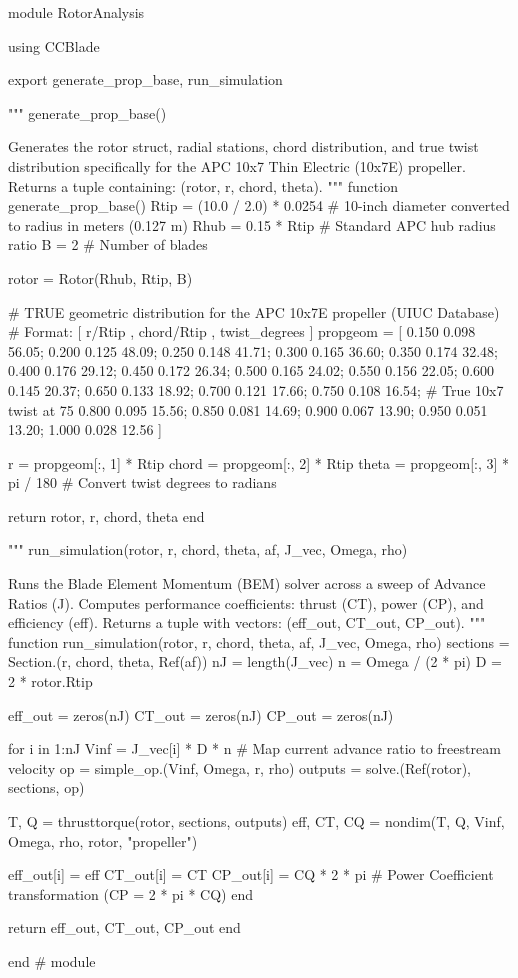 module RotorAnalysis

using CCBlade

export generate_prop_base, run_simulation

"""
    generate_prop_base()

Generates the rotor struct, radial stations, chord distribution, and true twist distribution 
specifically for the APC 10x7 Thin Electric (10x7E) propeller.
Returns a tuple containing: (rotor, r, chord, theta).
"""
function generate_prop_base()
    Rtip = (10.0 / 2.0) * 0.0254 # 10-inch diameter converted to radius in meters (0.127 m)
    Rhub = 0.15 * Rtip            # Standard APC hub radius ratio
    B = 2                         # Number of blades
    
    rotor = Rotor(Rhub, Rtip, B)
    
    # TRUE geometric distribution for the APC 10x7E propeller (UIUC Database)
    # Format: [ r/Rtip , chord/Rtip , twist_degrees ]
    propgeom = [
        0.150   0.098   56.05;
        0.200   0.125   48.09;
        0.250   0.148   41.71;
        0.300   0.165   36.60;
        0.350   0.174   32.48;
        0.400   0.176   29.12;
        0.450   0.172   26.34;
        0.500   0.165   24.02;
        0.550   0.156   22.05;
        0.600   0.145   20.37;
        0.650   0.133   18.92;
        0.700   0.121   17.66;
        0.750   0.108   16.54;  # True 10x7 twist at 75%
        0.800   0.095   15.56;
        0.850   0.081   14.69;
        0.900   0.067   13.90;
        0.950   0.051   13.20;
        1.000   0.028   12.56
    ]
    
    r = propgeom[:, 1] * Rtip
    chord = propgeom[:, 2] * Rtip
    theta = propgeom[:, 3] * pi / 180 # Convert twist degrees to radians
    
    return rotor, r, chord, theta
end

"""
    run_simulation(rotor, r, chord, theta, af, J_vec, Omega, rho)

Runs the Blade Element Momentum (BEM) solver across a sweep of Advance Ratios (J).
Computes performance coefficients: thrust (CT), power (CP), and efficiency (eff).
Returns a tuple with vectors: (eff_out, CT_out, CP_out).
"""
function run_simulation(rotor, r, chord, theta, af, J_vec, Omega, rho)
    sections = Section.(r, chord, theta, Ref(af))
    nJ = length(J_vec)
    n = Omega / (2 * pi)
    D = 2 * rotor.Rtip 
    
    eff_out = zeros(nJ)
    CT_out = zeros(nJ)
    CP_out = zeros(nJ)
    
    for i in 1:nJ
        Vinf = J_vec[i] * D * n # Map current advance ratio to freestream velocity
        op = simple_op.(Vinf, Omega, r, rho)
        outputs = solve.(Ref(rotor), sections, op)
        
        T, Q = thrusttorque(rotor, sections, outputs)
        eff, CT, CQ = nondim(T, Q, Vinf, Omega, rho, rotor, "propeller")
        
        eff_out[i] = eff
        CT_out[i] = CT
        CP_out[i] = CQ * 2 * pi # Power Coefficient transformation (CP = 2 * pi * CQ)
    end
    
    return eff_out, CT_out, CP_out
end

end # module

